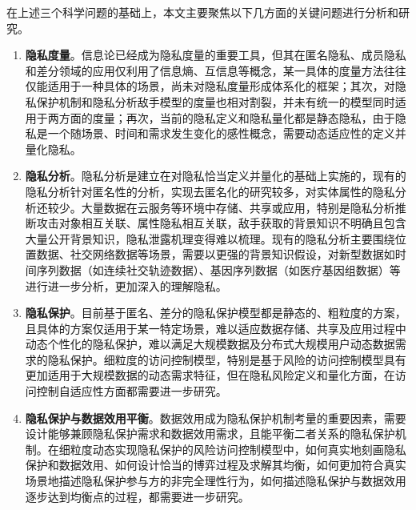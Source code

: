 \documentclass[pdftex,notypeinfo,twoside,openany,UTF8,fntef]{CASthesis}
\theoremstyle{THrm}{
	\newtheorem{question}{Question}[section]
	\newtheorem{property}{性质}[section]
	\newtheorem{assumption}{假设}[section]
	\newtheorem{claim}[lemma]{断言}
	
}
\begin{document}
在上述三个科学问题的基础上，本文主要聚焦以下几方面的关键问题进行分析和研究。

\begin{enumerate}
	\item \textbf{隐私度量}。信息论已经成为隐私度量的重要工具，但其在匿名隐私、成员隐私和差分领域的应用仅利用了信息熵、互信息等概念，某一具体的度量方法往往仅能适用于一种具体的场景，尚未对隐私度量形成体系化的框架；其次，对隐私保护机制和隐私分析敌手模型的度量也相对割裂，并未有统一的模型同时适用于两方面的度量；再次，当前的隐私定义和隐私量化都是静态隐私，由于隐私是一个随场景、时间和需求发生变化的感性概念，需要动态适应性的定义并量化隐私。
	
	
	\item \textbf{隐私分析}。隐私分析是建立在对隐私恰当定义并量化的基础上实施的，现有的隐私分析针对匿名性的分析，实现去匿名化的研究较多，对实体属性的隐私分析还较少。大量数据在云服务等环境中存储、共享或应用，特别是隐私分析推断攻击对象相互关联、属性隐私相互关联，敌手获取的背景知识不明确且包含大量公开背景知识，隐私泄露机理变得难以梳理。现有的隐私分析主要围绕位置数据、社交网络数据等场景，需要以更强的背景知识假设，对新型数据如时间序列数据（如连续社交轨迹数据）、基因序列数据（如医疗基因组数据）等进行进一步分析，更加深入的理解隐私。
	
	\item  \textbf{隐私保护}。目前基于匿名、差分的隐私保护模型都是静态的、粗粒度的方案，且具体的方案仅适用于某一特定场景，难以适应数据存储、共享及应用过程中动态个性化的隐私保护，难以满足大规模数据及分布式大规模用户动态数据需求的隐私保护。细粒度的访问控制模型，特别是基于风险的访问控制模型具有更加适用于大规模数据的动态需求特征，但在隐私风险定义和量化方面，在访问控制自适应性方面都需要进一步研究。
	
	\item \textbf{隐私保护与数据效用平衡}。数据效用成为隐私保护机制考量的重要因素，需要设计能够兼顾隐私保护需求和数据效用需求，且能平衡二者关系的隐私保护机制。在细粒度动态实现隐私保护的风险访问控制模型中，如何真实地刻画隐私保护和数据效用、如何设计恰当的博弈过程及求解其均衡，如何更加符合真实场景地描述隐私保护参与方的非完全理性行为，如何描述隐私保护与数据效用逐步达到均衡点的过程，都需要进一步研究。
\end{enumerate}
\end{document}
